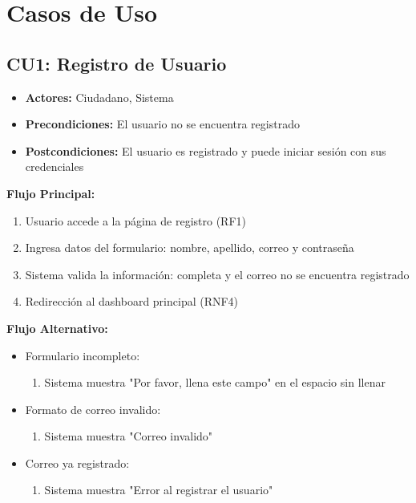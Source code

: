 \section{Casos de Uso}

\begin{multicols}{2}

\subsection*{CU1: Registro de Usuario}
\begin{itemize}
    \item \textbf{Actores:} Ciudadano, Sistema
    \item \textbf{Precondiciones:} El usuario no se encuentra registrado
    \item \textbf{Postcondiciones:} El usuario es registrado y puede iniciar sesión con sus credenciales
\end{itemize}
\textbf{Flujo Principal:}
\begin{enumerate}
    \item Usuario accede a la página de registro (RF1)
    \item Ingresa datos del formulario: nombre, apellido, correo y contraseña
    \item Sistema valida la información: completa y el correo no se encuentra registrado 
    \item Redirección al dashboard principal (RNF4)
\end{enumerate}

\textbf{Flujo Alternativo:}
\begin{itemize}
    \item Formulario incompleto:
    \begin{enumerate}
        \item Sistema muestra "Por favor, llena este campo" en el espacio sin llenar
    \end{enumerate}
    \item Formato de correo invalido:
    \begin{enumerate}
        \item Sistema muestra "Correo invalido"
    \end{enumerate}
    \item Correo ya registrado:
    \begin{enumerate}
        \item Sistema muestra "Error al registrar el usuario"
    \end{enumerate}
\end{itemize}


\end{multicols}
